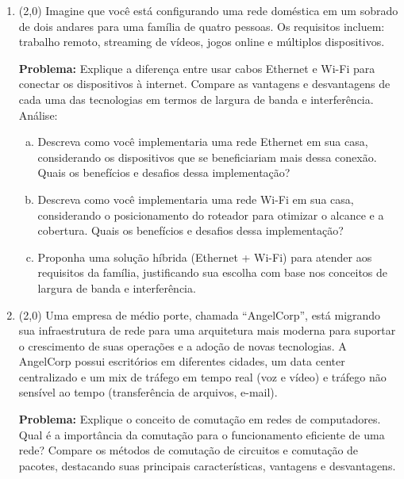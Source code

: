 \documentclass[a4paper,11pt]{modelo/prova}
\begin{document}
\maketitle

\begin{enumerate}
   \item (2,0) Imagine que você está configurando uma rede doméstica em um sobrado de dois andares para uma família de quatro pessoas. Os requisitos incluem: trabalho remoto, streaming de vídeos, jogos online e múltiplos dispositivos.

   \textbf{Problema:} Explique a diferença entre usar cabos Ethernet e Wi-Fi para conectar os dispositivos à internet. Compare as vantagens e desvantagens de cada uma das tecnologias em termos de largura de banda e interferência.
   Análise:
   \begin{enumerate}[a)]
      \item Descreva como você implementaria uma rede Ethernet em sua casa, considerando os dispositivos que se beneficiariam mais dessa conexão. Quais os benefícios e desafios dessa implementação?
      \item Descreva como você implementaria uma rede Wi-Fi em sua casa, considerando o posicionamento do roteador para otimizar o alcance e a cobertura. Quais os benefícios e desafios dessa implementação?
      \item Proponha uma solução híbrida (Ethernet + Wi-Fi) para atender aos requisitos da família, justificando sua escolha com base nos conceitos de largura de banda e interferência.
   \end{enumerate}

   \item (2,0) Uma empresa de médio porte, chamada ``AngelCorp'', está migrando sua infraestrutura de rede para uma arquitetura mais moderna para suportar o crescimento de suas operações e a adoção de novas tecnologias. A AngelCorp possui escritórios em diferentes cidades, um data center centralizado e um mix de tráfego em tempo real (voz e vídeo) e tráfego não sensível ao tempo (transferência de arquivos, e-mail).

   \textbf{Problema:} Explique o conceito de comutação em redes de computadores. Qual é a importância da comutação para o funcionamento eficiente de uma rede? Compare os métodos de comutação de circuitos e comutação de pacotes, destacando suas principais características, vantagens e desvantagens.


\end{enumerate}
\end{document}

